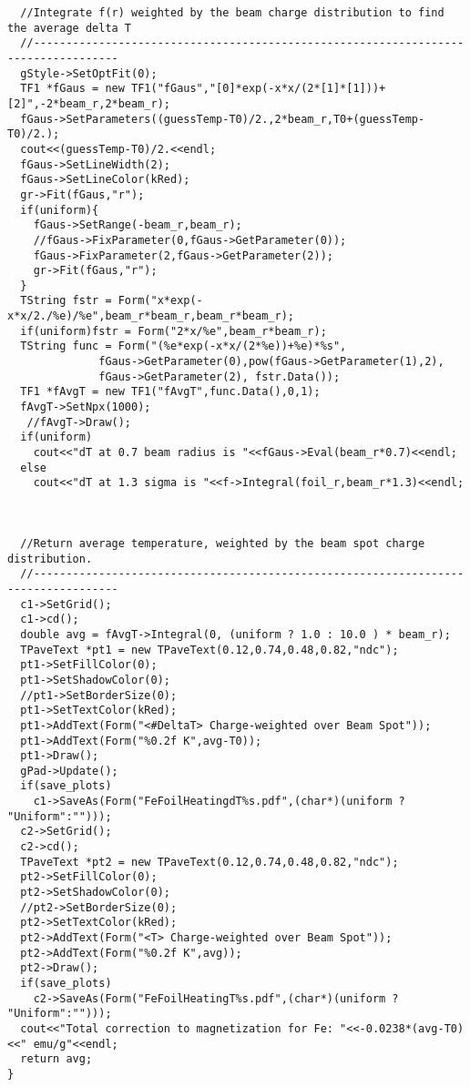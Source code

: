 \documentclass[12pt]{article}
\begin{document}
\begin{lstlisting}
  //Integrate f(r) weighted by the beam charge distribution to find the average delta T 
  //-----------------------------------------------------------------------------------
  gStyle->SetOptFit(0);
  TF1 *fGaus = new TF1("fGaus","[0]*exp(-x*x/(2*[1]*[1]))+[2]",-2*beam_r,2*beam_r);
  fGaus->SetParameters((guessTemp-T0)/2.,2*beam_r,T0+(guessTemp-T0)/2.);
  cout<<(guessTemp-T0)/2.<<endl;
  fGaus->SetLineWidth(2);
  fGaus->SetLineColor(kRed);
  gr->Fit(fGaus,"r");
  if(uniform){
    fGaus->SetRange(-beam_r,beam_r);
    //fGaus->FixParameter(0,fGaus->GetParameter(0));
    fGaus->FixParameter(2,fGaus->GetParameter(2));
    gr->Fit(fGaus,"r");
  }
  TString fstr = Form("x*exp(-x*x/2./%e)/%e",beam_r*beam_r,beam_r*beam_r);
  if(uniform)fstr = Form("2*x/%e",beam_r*beam_r);
  TString func = Form("(%e*exp(-x*x/(2*%e))+%e)*%s",
		      fGaus->GetParameter(0),pow(fGaus->GetParameter(1),2),
		      fGaus->GetParameter(2), fstr.Data());
  TF1 *fAvgT = new TF1("fAvgT",func.Data(),0,1);
  fAvgT->SetNpx(1000);
   //fAvgT->Draw();
  if(uniform)
    cout<<"dT at 0.7 beam radius is "<<fGaus->Eval(beam_r*0.7)<<endl;
  else
    cout<<"dT at 1.3 sigma is "<<f->Integral(foil_r,beam_r*1.3)<<endl;

  

  //Return average temperature, weighted by the beam spot charge distribution.
  //-----------------------------------------------------------------------------------
  c1->SetGrid();
  c1->cd();
  double avg = fAvgT->Integral(0, (uniform ? 1.0 : 10.0 ) * beam_r);
  TPaveText *pt1 = new TPaveText(0.12,0.74,0.48,0.82,"ndc");
  pt1->SetFillColor(0);
  pt1->SetShadowColor(0);
  //pt1->SetBorderSize(0);
  pt1->SetTextColor(kRed);
  pt1->AddText(Form("<#DeltaT> Charge-weighted over Beam Spot"));
  pt1->AddText(Form("%0.2f K",avg-T0));
  pt1->Draw();
  gPad->Update();
  if(save_plots)
    c1->SaveAs(Form("FeFoilHeatingdT%s.pdf",(char*)(uniform ? "Uniform":"")));
  c2->SetGrid();
  c2->cd();
  TPaveText *pt2 = new TPaveText(0.12,0.74,0.48,0.82,"ndc");
  pt2->SetFillColor(0);
  pt2->SetShadowColor(0);
  //pt2->SetBorderSize(0);
  pt2->SetTextColor(kRed);
  pt2->AddText(Form("<T> Charge-weighted over Beam Spot"));
  pt2->AddText(Form("%0.2f K",avg));
  pt2->Draw();
  if(save_plots)
    c2->SaveAs(Form("FeFoilHeatingT%s.pdf",(char*)(uniform ? "Uniform":"")));
  cout<<"Total correction to magnetization for Fe: "<<-0.0238*(avg-T0)<<" emu/g"<<endl;
  return avg;
}

\end{lstlisting}
\end{document}
